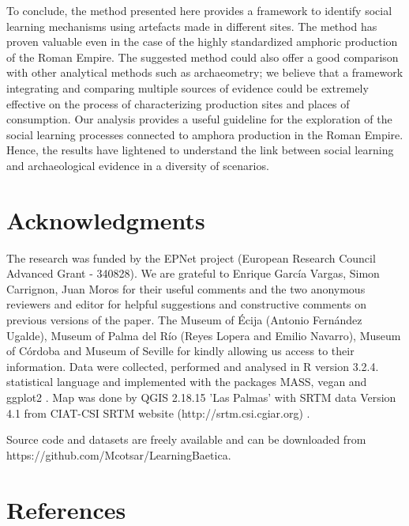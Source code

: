 \documentclass[review]{elsarticle}
\begin{document}
To conclude, the method presented here provides a framework to identify social learning mechanisms using artefacts made in different sites. The method has proven valuable even in the case of the highly standardized amphoric production of the Roman Empire. The suggested method could also offer a good comparison with other analytical methods such as archaeometry; we believe that a framework integrating and comparing multiple sources of evidence could be extremely effective on the process of characterizing production sites and places of consumption. Our analysis provides a useful guideline for the exploration of the social learning processes connected to amphora production in the Roman Empire. Hence, the results have lightened to understand the link between social learning and archaeological evidence in a diversity of scenarios. 
 

\section{Acknowledgments}

The research was funded by the EPNet project (European Research Council Advanced Grant - 340828). We are grateful to Enrique Garc\'ia Vargas, Simon Carrignon, Juan Moros for their useful comments and the two anonymous reviewers and editor for helpful suggestions and constructive comments on previous versions of the paper. The Museum of \'Ecija (Antonio Fern\'andez Ugalde), Museum of Palma del R\'io (Reyes Lopera and Emilio Navarro), Museum of C\'ordoba and Museum of Seville for kindly allowing us access to their information. Data were collected, performed and analysed in R version 3.2.4. statistical language and implemented with the packages MASS, vegan and ggplot2 \citep{ripley_package_2013,oksanen_vegan_2007,ggplot2:_2016}. Map was done by QGIS 2.18.15 'Las Palmas' with SRTM data Version 4.1 from CIAT-CSI SRTM website (http://srtm.csi.cgiar.org) \citep{SRTM}. 

Source code and datasets are freely available and can be downloaded from https://github.com/Mcotsar/LearningBaetica.  

\section*{References}


\end{document}
